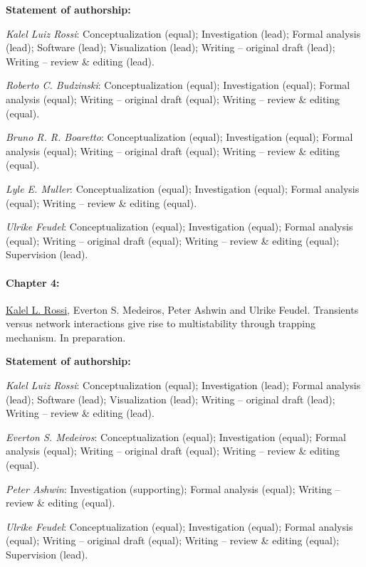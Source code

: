 {\vspace{0.3cm}\footnotesize \textbf{Statement of authorship:} %

\textit{Kalel Luiz Rossi}: Conceptualization (equal); Investigation (lead); Formal analysis (lead); Software (lead); Visualization (lead); Writing – original draft (lead); Writing – review \& editing (lead). 

\textit{Roberto C. Budzinski}: Conceptualization (equal); Investigation (equal); Formal analysis (equal); Writing – original draft (equal); Writing – review \& editing (equal).

\textit{Bruno R. R. Boaretto}: Conceptualization (equal); Investigation (equal); Formal analysis (equal);  Writing – original draft (equal); Writing – review \& editing (equal).

\textit{Lyle E. Muller}: Conceptualization (equal); Investigation (equal); Formal analysis (equal); Writing – review \& editing (equal).

\textit{Ulrike Feudel}: Conceptualization (equal); Investigation (equal); Formal analysis (equal); Writing – original draft (equal); Writing – review \& editing (equal); Supervision (lead).
}

\paragraph{Chapter 4:}
\underline{Kalel L. Rossi}, Everton S. Medeiros, Peter Ashwin and Ulrike Feudel. Transients versus network interactions give rise to multistability through trapping mechanism. In preparation.

{\vspace{0.3cm}\footnotesize \textbf{Statement of authorship:} %

\textit{Kalel Luiz Rossi}: Conceptualization (equal); Investigation (lead); Formal analysis (lead); Software (lead); Visualization (lead); Writing – original draft (lead); Writing – review \& editing (lead). 

\textit{Everton S. Medeiros}: Conceptualization (equal); Investigation (equal); Formal analysis (equal); Writing – original draft (equal); Writing – review \& editing (equal).

\textit{Peter Ashwin}: Investigation (supporting); Formal analysis (equal); Writing – review \& editing (equal).

\textit{Ulrike Feudel}: Conceptualization (equal); Investigation (equal); Formal analysis (equal); Writing – original draft (equal); Writing – review \& editing (equal); Supervision (lead).
}

